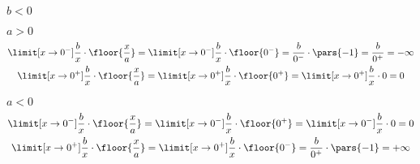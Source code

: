 \begin{proofcases}
\begin{proofcases}
\begin{proofcases}
\begin{gather*}
                        \end{gather*}
                \end{proofcases}
            \item \(b < 0\)
                \begin{proofcases}
                    \item \(a > 0\)
                        \begin{gather*}
                            \limit[x \to 0^-] \frac{b}{x} \cdot \floor{\frac{x}{a}}
                                = \limit[x \to 0^-] \frac{b}{x} \cdot \floor{0^-}
                                = \frac{b}{0^-} \cdot \pars{-1}
                                = \frac{b}{0^+}
                                = -\infty\\
                            \limit[x \to 0^+] \frac{b}{x} \cdot \floor{\frac{x}{a}}
                                = \limit[x \to 0^+] \frac{b}{x} \cdot \floor{0^+}
                                = \limit[x \to 0^+] \frac{b}{x} \cdot 0
                                = 0
                        \end{gather*}
                    \item \(a < 0\)
                        \begin{gather*}
                            \limit[x \to 0^-] \frac{b}{x} \cdot \floor{\frac{x}{a}}
                                = \limit[x \to 0^-] \frac{b}{x} \cdot \floor{0^+}
                                = \limit[x \to 0^-] \frac{b}{x} \cdot 0
                                = 0\\
                            \limit[x \to 0^+] \frac{b}{x} \cdot \floor{\frac{x}{a}}
                                = \limit[x \to 0^+] \frac{b}{x} \cdot \floor{0^-}
                                = \frac{b}{0^+} \cdot \pars{-1}
                                = +\infty
                        \end{gather*}
                \end{proofcases}
        \end{proofcases}
\end{proofcases}
